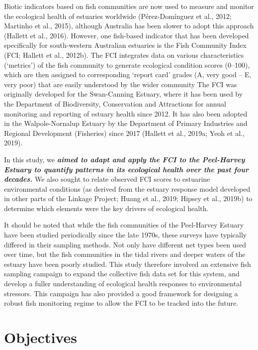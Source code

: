 \documentclass[
]{book}
\begin{document}
Biotic indicators based on fish communities are now used to measure and monitor the ecological health of estuaries worldwide (Pérez-Domínguez et al., 2012; Martinho et al., 2015), although Australia has been slower to adopt this approach (Hallett et al., 2016). However, one fish-based indicator that has been developed specifically for south-western Australian estuaries is the Fish Community Index (FCI; Hallett et al., 2012b). The FCI integrates data on various characteristics (`metrics') of the fish community to generate ecological condition scores (0--100), which are then assigned to corresponding `report card' grades (A, very good -- E, very poor) that are easily understood by the wider community The FCI was originally developed for the Swan-Canning Estuary, where it has been used by the Department of Biodiversity, Conservation and Attractions for annual monitoring and reporting of estuary health since 2012. It has also been adopted in the Walpole-Nornalup Estuary by the Department of Primary Industries and Regional Development (Fisheries) since 2017 (Hallett et al., 2019a; Yeoh et al., 2019).~

In this study, we \textbf{\emph{aimed to adapt and apply the FCI to the Peel-Harvey Estuary to quantify patterns in its ecological health over the past four decades.}} We also sought to relate observed FCI scores to estuarine environmental conditions (as derived from the estuary response model developed in other parts of the Linkage Project; Huang et al., 2019; Hipsey et al., 2019b) to determine which elements were the key drivers of ecological health.~

It should be noted that while the fish communities of the Peel-Harvey Estuary have been studied periodically since the late 1970s, these surveys have typically differed in their sampling methods. Not only have different net types been used over time, but the fish communities in the tidal rivers and deeper waters of the estuary have been poorly studied. This study therefore involved an extensive fish sampling campaign to expand the collective fish data set for this system, and develop a fuller understanding of ecological health responses to environmental stressors. This campaign has also provided a good framework for designing a robust fish monitoring regime to allow the FCI to be tracked into the future.

\hypertarget{objectives-1}{%
\section{Objectives}\label{objectives-1}}
\end{document}
